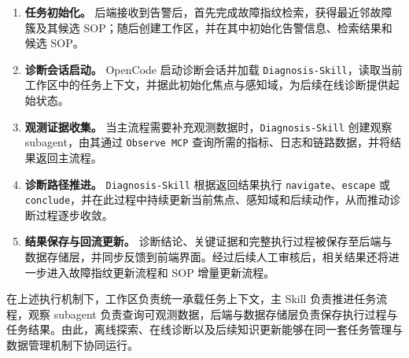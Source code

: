 \begin{enumerate}[label=（\arabic*）]
    \item \textbf{任务初始化。}
    后端接收到告警后，首先完成故障指纹检索，获得最近邻故障簇及其候选 SOP；随后创建工作区，并在其中初始化告警信息、检索结果和候选 SOP。

    \item \textbf{诊断会话启动。}
    OpenCode 启动诊断会话并加载 \texttt{Diagnosis-Skill}，读取当前工作区中的任务上下文，并据此初始化焦点与感知域，为后续在线诊断提供起始状态。

    \item \textbf{观测证据收集。}
    当主流程需要补充观测数据时，\texttt{Diagnosis-Skill} 创建观察 subagent，由其通过 \texttt{Observe MCP} 查询所需的指标、日志和链路数据，并将结果返回主流程。

    \item \textbf{诊断路径推进。}
    \texttt{Diagnosis-Skill} 根据返回结果执行 \texttt{navigate}、\texttt{escape} 或 \texttt{conclude}，并在此过程中持续更新当前焦点、感知域和后续动作，从而推动诊断过程逐步收敛。

    \item \textbf{结果保存与回流更新。}
    诊断结论、关键证据和完整执行过程被保存至后端与数据存储层，并同步反馈到前端界面。经过后续人工审核后，相关结果还将进一步进入故障指纹更新流程和 SOP 增量更新流程。
\end{enumerate}

在上述执行机制下，工作区负责统一承载任务上下文，主 Skill 负责推进任务流程，观察 subagent 负责查询可观测数据，后端与数据存储层负责保存执行过程与任务结果。由此，离线探索、在线诊断以及后续知识更新能够在同一套任务管理与数据管理机制下协同运行。